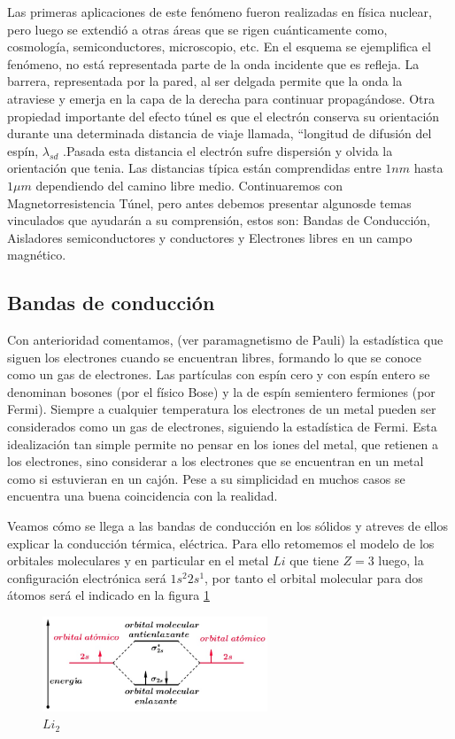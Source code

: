 Las primeras aplicaciones de este fenómeno fueron realizadas en física nuclear, pero luego se extendió a otras áreas que se rigen cuánticamente como, cosmología, semiconductores, microscopio, etc. En el esquema se ejemplifica el fenómeno, no está representada parte de la onda incidente que es refleja. La barrera, representada por la pared, al ser delgada permite que la onda la atraviese y emerja en la capa de la derecha para continuar propagándose. Otra propiedad importante del efecto túnel es que el electrón conserva su orientación durante una determinada distancia de viaje llamada, “longitud de difusión del espín, $\lambda_{sd}$ .Pasada esta distancia el electrón sufre dispersión y olvida la orientación que tenia. Las distancias típica están comprendidas entre $1nm$ hasta $1\mu m$ dependiendo del camino libre medio. Continuaremos con Magnetorresistencia Túnel, pero antes debemos presentar algunosde temas vinculados que ayudarán a su comprensión, estos son: Bandas de Conducción, Aisladores semiconductores y conductores y Electrones libres en un campo magnético.

\subsection{Bandas de conducción}
Con anterioridad comentamos, (ver paramagnetismo de Pauli) la estadística que siguen los electrones cuando se encuentran libres, formando lo que se conoce como un gas de electrones. Las partículas con espín cero y con espín entero se denominan bosones (por el físico Bose) y la de espín semientero fermiones (por Fermi). Siempre a cualquier temperatura los electrones de un metal pueden ser considerados como un gas de electrones, siguiendo la estadística de Fermi. Esta idealización tan simple permite no pensar en los iones del metal, que retienen a los electrones, sino considerar a los electrones que se encuentran en un metal como si estuvieran en un cajón. Pese a su simplicidad en muchos casos se encuentra una buena coincidencia con la realidad.

Veamos cómo se llega a las bandas de conducción en los sólidos y atreves de ellos
explicar la conducción térmica, eléctrica. Para ello retomemos el modelo de los orbitales moleculares y en particular en el metal $Li$ que tiene $Z=3$ luego, la configuración electrónica será $1s^{2}2s^{1}$, por tanto el orbital molecular
para dos átomos será el indicado en la figura \ref{fig:341}

\begin{figure}[H]
    \centering
    \includegraphics[width=0.6\textwidth]{./Figures/fig341}
	\caption{$Li_{2}$}
	\label{fig:341}
\end{figure}

